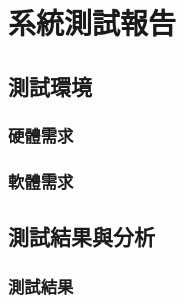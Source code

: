 \section{系統測試報告}

\subsection{測試環境}

\subsubsection{硬體需求}
 
\subsubsection{軟體需求}

\subsection{測試結果與分析}

\subsubsection{測試結果}


